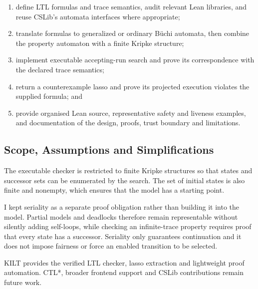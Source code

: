 \begin{enumerate}
  \setlength{\itemsep}{0pt}
  \setlength{\parskip}{0pt}
  \item define LTL formulas and trace semantics, audit relevant Lean libraries,
    and reuse CSLib's automata interfaces where appropriate;
  \item translate formulas to generalized or ordinary B\"uchi automata, then
    combine the property automaton with a finite Kripke structure;
  \item implement executable accepting-run search and prove its correspondence
    with the declared trace semantics;
  \item return a counterexample lasso and prove its projected execution violates
    the supplied formula; and
  \item provide organised Lean source, representative safety and liveness
    examples, and documentation of the design, proofs, trust boundary and
    limitations.
\end{enumerate}

\subsection{Scope, Assumptions and Simplifications}

The executable checker is restricted to finite Kripke structures so that states
and successor sets can be enumerated by the search. The set of initial states is
also finite and nonempty, which ensures that the model has a starting point.

I kept seriality as a separate proof obligation rather than building it into
the model. Partial models and deadlocks therefore remain representable without
silently adding self-loops, while checking an infinite-trace property requires
proof that every state has a successor. Seriality only guarantees continuation and
it does not impose fairness or force an enabled transition to be selected.

KILT provides the verified LTL checker, lasso extraction and lightweight proof
automation. CTL*, broader frontend support and CSLib contributions remain
future work.
